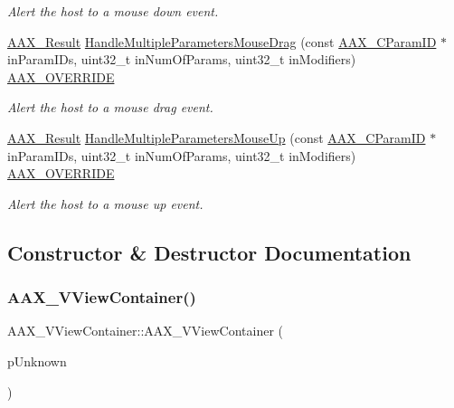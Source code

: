 \begin{DoxyCompactItemize}
\begin{DoxyCompactList}\small\item\em Alert the host to a mouse down event. \end{DoxyCompactList}\item 
\mbox{\hyperlink{a00392_a4d8f69a697df7f70c3a8e9b8ee130d2f}{A\+A\+X\+\_\+\+Result}} \mbox{\hyperlink{a01945_a518e4eddd79f0ba3204472a00cbe2266}{Handle\+Multiple\+Parameters\+Mouse\+Drag}} (const \mbox{\hyperlink{a00392_a1440c756fe5cb158b78193b2fc1780d1}{A\+A\+X\+\_\+\+C\+Param\+ID}} $\ast$in\+Param\+I\+Ds, uint32\+\_\+t in\+Num\+Of\+Params, uint32\+\_\+t in\+Modifiers) \mbox{\hyperlink{a00392_ac2f24a5172689ae684344abdcce55463}{A\+A\+X\+\_\+\+O\+V\+E\+R\+R\+I\+DE}}
\begin{DoxyCompactList}\small\item\em Alert the host to a mouse drag event. \end{DoxyCompactList}\item 
\mbox{\hyperlink{a00392_a4d8f69a697df7f70c3a8e9b8ee130d2f}{A\+A\+X\+\_\+\+Result}} \mbox{\hyperlink{a01945_a7df890b95c925f00536ff97e1322d7b4}{Handle\+Multiple\+Parameters\+Mouse\+Up}} (const \mbox{\hyperlink{a00392_a1440c756fe5cb158b78193b2fc1780d1}{A\+A\+X\+\_\+\+C\+Param\+ID}} $\ast$in\+Param\+I\+Ds, uint32\+\_\+t in\+Num\+Of\+Params, uint32\+\_\+t in\+Modifiers) \mbox{\hyperlink{a00392_ac2f24a5172689ae684344abdcce55463}{A\+A\+X\+\_\+\+O\+V\+E\+R\+R\+I\+DE}}
\begin{DoxyCompactList}\small\item\em Alert the host to a mouse up event. \end{DoxyCompactList}\end{DoxyCompactItemize}


\subsection{Constructor \& Destructor Documentation}
\mbox{\label{a01945_aac7bd02ee005502da1d1b81667ced4a3}} 
\subsubsection{\texorpdfstring{AAX\_VViewContainer()}{AAX\_VViewContainer()}}
{\footnotesize\ttfamily A\+A\+X\+\_\+\+V\+View\+Container\+::\+A\+A\+X\+\_\+\+V\+View\+Container (\begin{DoxyParamCaption}\item[{\mbox{\hyperlink{a01409}{I\+A\+C\+F\+Unknown}} $\ast$}]{p\+Unknown }\end{DoxyParamCaption})}

